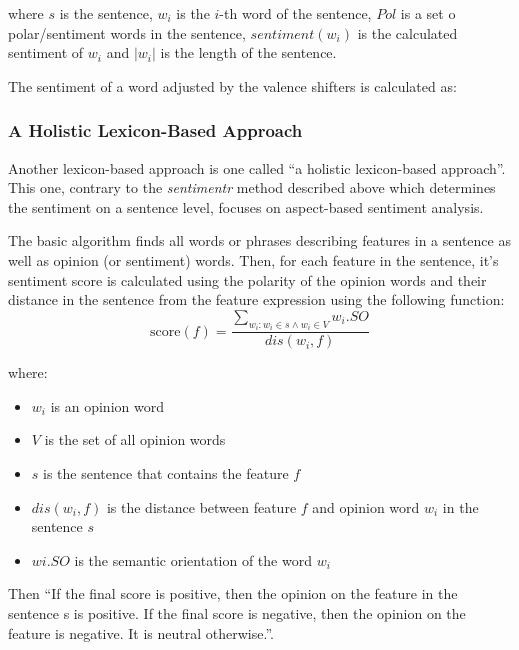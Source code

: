 where $s$ is the sentence, $w_{i}$ is the $i$-th word of the sentence, $Pol$ is a set o polar/sentiment words in the sentence, $sentiment(w_{i})$ is the calculated sentiment of $w_{i}$ and $|w_{i}|$ is the length of the sentence.

The sentiment of a word adjusted by the valence shifters is calculated as:

\subsubsection{A Holistic Lexicon-Based Approach} 
Another lexicon-based approach is one called ``a holistic lexicon-based approach''.\cite{ding_hu_liu} This one, contrary to the \textit{sentimentr} method described above which determines the sentiment on a sentence level, focuses on aspect-based sentiment analysis. 

The basic algorithm finds all words or phrases describing features in a sentence as well as opinion (or sentiment) words. Then, for each feature in the sentence, it's sentiment score is calculated using the polarity of the opinion words and their distance in the sentence from the feature expression using the following function:
$$
\textrm{score}(f) = \frac{\sum_{w_{i} : w_{i} \in s \wedge w_{i} \in V}w_{i}.SO}{dis(w_{i},f)}
$$

where:
\begin{itemize}
\item $w_{i}$ is an opinion word
\item $V$ is the set of all opinion words
\item $s$ is the sentence that contains the feature $f$
\item  $dis(w_{i} , f)$ is the distance between feature $f$ and
opinion word $w_{i}$ in the sentence $s$
\item $w i .SO$ is the semantic orientation of the word $w_{i}$
\end{itemize}
Then ``If the final score is positive, then the opinion on the feature in
the sentence s is positive. If the final score is negative, then
the opinion on the feature is negative. It is neutral otherwise.''\cite{ding_hu_liu}.

